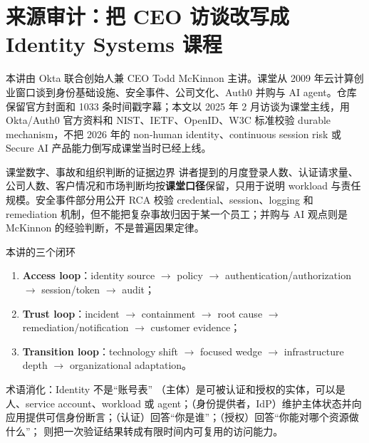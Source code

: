 \section{来源审计：把 CEO 访谈改写成 Identity Systems 课程}

本讲由 Okta 联合创始人兼 CEO Todd McKinnon 主讲。课堂从 2009 年云计算创业窗口谈到身份基础设施、安全事件、公司文化、Auth0 并购与 AI agent。仓库保留官方封面和 1033 条时间戳字幕；本文以 2025 年 2 月访谈为课堂主线，用 Okta/Auth0 官方资料和 NIST、IETF、OpenID、W3C 标准校验 durable mechanism，不把 2026 年的 non-human identity、continuous session risk 或 Secure AI 产品能力倒写成课堂当时已经上线。

\begin{warningbox}{课堂数字、事故和组织判断的证据边界}
讲者提到的月度登录人数、认证请求量、公司人数、客户情况和市场判断均按\textbf{课堂口径}保留，只用于说明 workload 与责任规模。安全事件部分用公开 RCA 校验 credential、session、logging 和 remediation 机制，但不能把复杂事故归因于某一个员工；并购与 AI 观点则是 McKinnon 的经验判断，不是普遍因果定律。
\end{warningbox}

\begin{importantbox}{本讲的三个闭环}
\begin{enumerate}
  \item \textbf{Access loop}：identity source $\rightarrow$ policy $\rightarrow$ authentication/authorization $\rightarrow$ session/token $\rightarrow$ audit；
  \item \textbf{Trust loop}：incident $\rightarrow$ containment $\rightarrow$ root cause $\rightarrow$ remediation/notification $\rightarrow$ customer evidence；
  \item \textbf{Transition loop}：technology shift $\rightarrow$ focused wedge $\rightarrow$ infrastructure depth $\rightarrow$ organizational adaptation。
\end{enumerate}
\end{importantbox}

\begin{knowledgebox}{术语消化：Identity 不是“账号表”}
（主体）是可被认证和授权的实体，可以是人、service account、workload 或 agent；（身份提供者，IdP）维护主体状态并向应用提供可信身份断言；（认证）回答“你是谁”；（授权）回答“你能对哪个资源做什么”； 则把一次验证结果转成有限时间内可复用的访问能力。
\end{knowledgebox}

